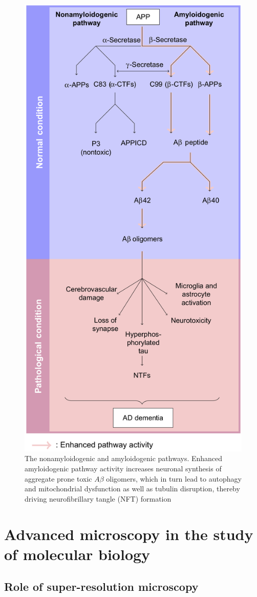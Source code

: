 \begin{figure}[h!]
  \center
  \includegraphics[width=0.7\linewidth]{figures/10_amyloidogenic_pathway}
  \caption{The nonamyloidogenic and amyloidogenic pathways. Enhanced amyloidogenic pathway activity increases neuronal synthesis of aggregate prone toxic $A\beta$ oligomers, which in turn lead to autophagy and mitochondrial dysfunction as well as tubulin disruption, thereby driving neurofibrillary tangle (NFT) formation}
  \label{fig:10_amyloidogenic_pathway}
\end{figure}

\section{Advanced microscopy in the study of molecular biology}
\subsection{Role of super-resolution microscopy }

